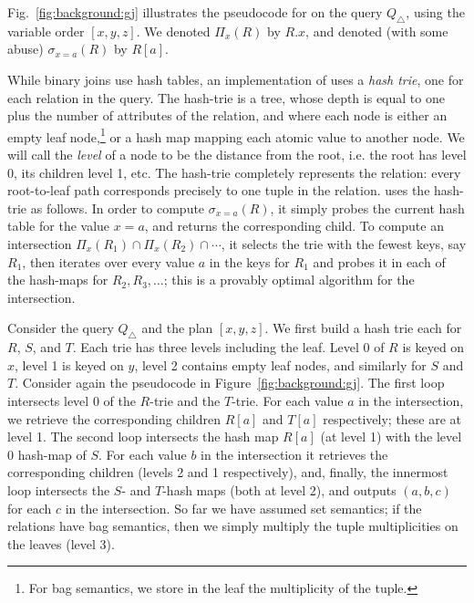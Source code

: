 \begin{ex}
  Fig.~\ref{fig:background:gj} illustrates the pseudocode for \GJ on the
  query $Q_\triangle$, using the variable order $[x,y,z]$.  We denoted
  $\Pi_x(R)$ by $R.x$, and denoted (with some abuse) $\sigma_{x=a}(R)$
  by $R[a]$.
\end{ex}


While binary joins use hash tables, an implementation of \GJ uses a
\emph{hash trie}, one for each relation in the query.  The hash-trie
is a tree, whose depth is equal to one plus the number of attributes
of the relation, and where each node is either an empty leaf
node,\footnote{For bag semantics, we store in the leaf the
  multiplicity of the tuple.} or a hash map mapping each atomic value
to another node.  We will call the \emph{level} of a node to be the
distance from the root, i.e. the root has level 0, its children level
1, etc.  The hash-trie completely represents the relation: every
root-to-leaf path corresponds precisely to one tuple in the relation.
\GJ uses the hash-trie as follows.  In order to compute
$\sigma_{x=a}(R)$, it simply probes the current hash table for the
value $x=a$, and returns the corresponding child.  To compute an
intersection $\Pi_x(R_1) \cap \Pi_x(R_2) \cap \cdots$, it selects the
trie with the fewest keys, say $R_1$, then iterates over every value
$a$ in the keys for $R_1$ and probes it in each of the hash-maps for
$R_2, R_3, \ldots$; this is a provably optimal algorithm for the
intersection.

\begin{ex}
  Consider the query $Q_\triangle$ and the \GJ plan $[x, y, z]$.  We
  first build a hash trie each for $R$, $S$, and $T$.  Each trie has
  three levels including the leaf.  Level 0 of $R$ is keyed on $x$,
  level 1 is keyed on $y$, level 2 contains empty leaf nodes, and
  similarly for $S$ and $T$.  Consider again the pseudocode in
  Figure~\ref{fig:background:gj}.  The first loop intersects level 0
  of the $R$-trie and the $T$-trie.  For each value $a$ in the
  intersection, we retrieve the corresponding children $R[a]$ and
  $T[a]$ respectively; these are at level 1.  The second loop
  intersects the hash map $R[a]$ (at level 1) with the level 0
  hash-map of $S$.  For each value $b$ in the intersection it
  retrieves the corresponding children (levels 2 and 1 respectively),
  and, finally, the innermost loop intersects the $S$- and $T$-hash
  maps (both at level 2), and outputs $(a,b,c)$ for each $c$ in the
  intersection.  So far we have assumed set semantics; if the
  relations have bag semantics, then we simply multiply the tuple
  multiplicities on the leaves (level 3).
\end{ex}

